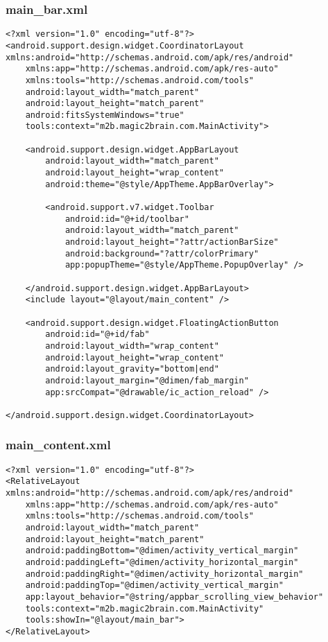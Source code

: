 \subsubsection*{main\_bar.xml}
\begin{lstlisting}
<?xml version="1.0" encoding="utf-8"?>
<android.support.design.widget.CoordinatorLayout xmlns:android="http://schemas.android.com/apk/res/android"
    xmlns:app="http://schemas.android.com/apk/res-auto"
    xmlns:tools="http://schemas.android.com/tools"
    android:layout_width="match_parent"
    android:layout_height="match_parent"
    android:fitsSystemWindows="true"
    tools:context="m2b.magic2brain.com.MainActivity">

    <android.support.design.widget.AppBarLayout
        android:layout_width="match_parent"
        android:layout_height="wrap_content"
        android:theme="@style/AppTheme.AppBarOverlay">

        <android.support.v7.widget.Toolbar
            android:id="@+id/toolbar"
            android:layout_width="match_parent"
            android:layout_height="?attr/actionBarSize"
            android:background="?attr/colorPrimary"
            app:popupTheme="@style/AppTheme.PopupOverlay" />

    </android.support.design.widget.AppBarLayout>
    <include layout="@layout/main_content" />

    <android.support.design.widget.FloatingActionButton
        android:id="@+id/fab"
        android:layout_width="wrap_content"
        android:layout_height="wrap_content"
        android:layout_gravity="bottom|end"
        android:layout_margin="@dimen/fab_margin"
        app:srcCompat="@drawable/ic_action_reload" />

</android.support.design.widget.CoordinatorLayout>
\end{lstlisting}

\subsubsection*{main\_content.xml}
\begin{lstlisting}
<?xml version="1.0" encoding="utf-8"?>
<RelativeLayout xmlns:android="http://schemas.android.com/apk/res/android"
    xmlns:app="http://schemas.android.com/apk/res-auto"
    xmlns:tools="http://schemas.android.com/tools"
    android:layout_width="match_parent"
    android:layout_height="match_parent"
    android:paddingBottom="@dimen/activity_vertical_margin"
    android:paddingLeft="@dimen/activity_horizontal_margin"
    android:paddingRight="@dimen/activity_horizontal_margin"
    android:paddingTop="@dimen/activity_vertical_margin"
    app:layout_behavior="@string/appbar_scrolling_view_behavior"
    tools:context="m2b.magic2brain.com.MainActivity"
    tools:showIn="@layout/main_bar">
</RelativeLayout>
\end{lstlisting}

